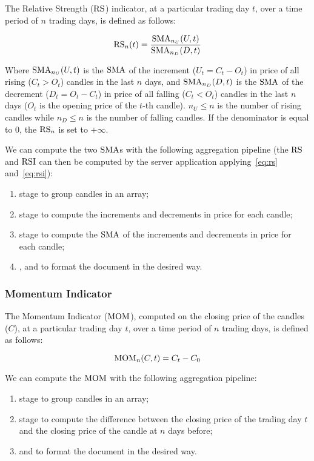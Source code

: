 The Relative Strength (\(\operatorname{RS}\)) indicator, at a particular trading day \(t\),
over a time period of \(n\) trading days, is defined as follows:

\begin{equation}\label{eq:rs}
	\operatorname{RS}_n(t) = \frac{\operatorname{SMA}_{n_U}(U,t)}{\operatorname{SMA}_{n_D}(D,t)}
\end{equation}

Where \(\operatorname{SMA}_{n_U}(U,t)\) is the \(\operatorname{SMA}\) of the increment (\(U_t = C_t - O_t\))
in price of all rising (\(C_t > O_t\)) candles in the last \(n\) days, and
\(\operatorname{SMA}_{n_D}(D,t)\) is the \(\operatorname{SMA}\) of the decrement (\(D_t = O_t - C_t\)) in
price of all falling (\(C_t < O_t\)) candles in the last \(n\) days (\(O_t\) is
the opening price of the \(t\)-th candle). \(n_U \leq n\) is the number of
rising candles while \(n_D \leq n\) is the number of falling candles. If the
denominator is equal to \(0\), the \(\operatorname{RS}_n\) is set to \(+\infty\).

We can compute the two \(\operatorname{SMA}\)s with the following aggregation pipeline (the
\(\operatorname{RS}\) and \(\operatorname{RSI}\) can then be computed by the server application
applying~\eqref{eq:rs} and~\eqref{eq:rsi}):

\begin{enumerate}
	\item {} stage to group candles in an array;
	\item {} stage to compute the increments and decrements
		in price for each candle;
	\item {} stage to compute the \(\operatorname{SMA}\) of the increments
		and decrements in price for each candle;
	\item {},  and  to
		format the document in the desired way.
\end{enumerate}

\subsubsection{Momentum Indicator}

The Momentum Indicator (\(\operatorname{MOM}\)), computed on the closing price of the candles
(\(C\)), at a particular trading day \(t\), over a time period of \(n\) trading
days, is defined as follows:

\begin{equation}\label{eq:mom}
	\operatorname{MOM}_n(C,t) = C_t - C_0
\end{equation}

We can compute the \(\operatorname{MOM}\) with the following aggregation pipeline:

\begin{enumerate}
	\item {} stage to group candles in an array;
	\item {} stage to compute the difference between the
		closing price of the trading day \(t\) and the closing price of
		the candle at \(n\) days before;
	\item {} and  to format the document
		in the desired way.
\end{enumerate}
